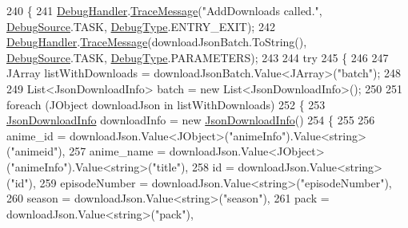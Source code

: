 \begin{DoxyCode}
240         \{
241             \mbox{\hyperlink{class_little_weeb_library_1_1_handlers_1_1_debug_handler}{DebugHandler}}.\mbox{\hyperlink{class_little_weeb_library_1_1_handlers_1_1_debug_handler_afccb37dfd6b2114af72000c2f4fe4607}{TraceMessage}}(\textcolor{stringliteral}{"AddDownloads called."}, 
      \mbox{\hyperlink{namespace_little_weeb_library_1_1_handlers_a2a6ca0775121c9c503d58aa254d292be}{DebugSource}}.TASK, \mbox{\hyperlink{namespace_little_weeb_library_1_1_handlers_ab66019ed40462876ec4e61bb3ccb0a62}{DebugType}}.ENTRY\_EXIT);
242             \mbox{\hyperlink{class_little_weeb_library_1_1_handlers_1_1_debug_handler}{DebugHandler}}.\mbox{\hyperlink{class_little_weeb_library_1_1_handlers_1_1_debug_handler_afccb37dfd6b2114af72000c2f4fe4607}{TraceMessage}}(downloadJsonBatch.ToString(), 
      \mbox{\hyperlink{namespace_little_weeb_library_1_1_handlers_a2a6ca0775121c9c503d58aa254d292be}{DebugSource}}.TASK, \mbox{\hyperlink{namespace_little_weeb_library_1_1_handlers_ab66019ed40462876ec4e61bb3ccb0a62}{DebugType}}.PARAMETERS);         
243 
244             \textcolor{keywordflow}{try}
245             \{
246 
247                 JArray listWithDownloads = downloadJsonBatch.Value<JArray>(\textcolor{stringliteral}{"batch"});
248 
249                 List<JsonDownloadInfo> batch = \textcolor{keyword}{new} List<JsonDownloadInfo>();
250 
251                 \textcolor{keywordflow}{foreach} (JObject downloadJson \textcolor{keywordflow}{in} listWithDownloads)
252                 \{
253                     \mbox{\hyperlink{class_little_weeb_library_1_1_models_1_1_json_download_info}{JsonDownloadInfo}} downloadInfo = \textcolor{keyword}{new} 
      \mbox{\hyperlink{class_little_weeb_library_1_1_models_1_1_json_download_info}{JsonDownloadInfo}}()
254                     \{
255 
256                         anime\_id = downloadJson.Value<JObject>(\textcolor{stringliteral}{"animeInfo"}).Value<string>(\textcolor{stringliteral}{"animeid"}),
257                         anime\_name = downloadJson.Value<JObject>(\textcolor{stringliteral}{"animeInfo"}).Value<string>(\textcolor{stringliteral}{"title"}),
258                         \textcolor{keywordtype}{id} = downloadJson.Value<\textcolor{keywordtype}{string}>(\textcolor{stringliteral}{"id"}),
259                         episodeNumber = downloadJson.Value<\textcolor{keywordtype}{string}>(\textcolor{stringliteral}{"episodeNumber"}),
260                         season = downloadJson.Value<\textcolor{keywordtype}{string}>(\textcolor{stringliteral}{"season"}),
261                         pack = downloadJson.Value<\textcolor{keywordtype}{string}>(\textcolor{stringliteral}{"pack"}),

\end{DoxyCode}
